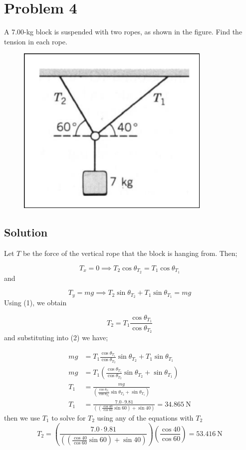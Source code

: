 \documentclass{article}
\begin{document}
\section*{Problem 4}
A 7.00-kg block is suspended with two ropes, as shown in the figure. Find the tension in each rope.
\begin{figure}[ht]
    \centering
    \includegraphics[scale=.4]{drawing-2.png}
\end{figure}

\subsection*{Solution}
Let $T$ be the force of the vertical rope that the block is hanging from. Then;

\begin{equation}
	T_x = 0 \implies T_2 \cos \theta_{T_2} = T_1 \cos \theta_{T_1}
\end{equation}
and

\begin{equation}
	T_y = mg \implies T_2 \sin \theta_{T_2} + T_1 \sin \theta_{T_1}= mg
\end{equation}
Using (1), we obtain

\[
	T_2 = T_1 \frac{\cos \theta_{T_1}}{\cos \theta_{T_2}}
\]
and substituting into (2) we have;

\begin{align*}
	mg &= T_1 \frac{\cos \theta_{T_1}}{\cos \theta_{T_2}} \sin \theta_{T_2} + T_1 \sin \theta_{T_1} \\
	mg &= T_1 \left( \frac{\cos \theta_{T_1}}{\cos \theta_{T_2}} \sin \theta_{T_2} + \sin \theta_{T_1} \right) \\
	T_1 &= \frac{mg}{\left( \frac{\cos \theta_{T_1}}{\cos \theta_{T_2}} \sin \theta_{T_2} + \sin \theta_{T_1} \right)} \\
	T_1 &= \frac{7.0\cdot9.81}{\left(\left(\frac{\cos40}{\cos60}\sin60\right)+\sin40\right)} = \boxed{34.865\ \text{N}}
\end{align*}
then we use $T_1$ to solve for $T_2$ using any of the equations with $T_2$
\[
	T_2 = \left(\frac{7.0\cdot9.81}{\left(\left(\frac{\cos40}{\cos60}\sin60\right)+\sin40\right)}\right)\left(\frac{\cos 40}{\cos 60}\right) = \boxed{53.416\ \text{N}}
\]
\end{document}
